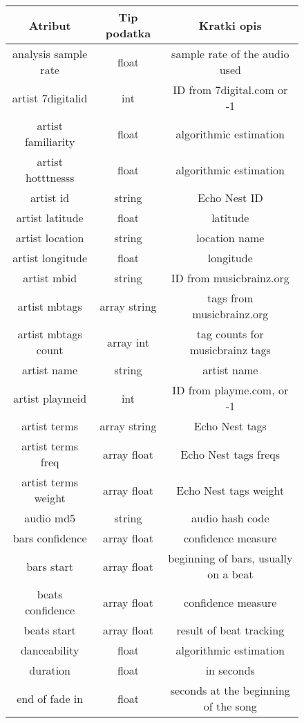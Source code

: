 \documentclass[a4paper]{article}
\begin{document}
\begin{figure}[!h]
    \centering
    \footnotesize
    \begin{tabular}{|c|c|c|}
        \hline
        Atribut & Tip podatka & Kratki opis \\
        \hline
        analysis sample rate & float & sample rate of the audio used \\
        artist 7digitalid & int & ID from 7digital.com or -1 \\
        artist familiarity & float & algorithmic estimation \\
        artist hotttnesss & float & algorithmic estimation \\
        artist id & string & Echo Nest ID \\
        artist latitude & float & latitude \\
        artist location & string & location name \\
        artist longitude & float & longitude \\
        artist mbid & string & ID from musicbrainz.org \\
        artist mbtags & array string & tags from musicbrainz.org \\
        artist mbtags count & array int & tag counts for musicbrainz tags \\
        artist name & string & artist name \\
        artist playmeid & int & ID from playme.com, or -1 \\
        artist terms & array string & Echo Nest tags \\
        artist terms freq & array float & Echo Nest tags freqs \\
        artist terms weight & array float & Echo Nest tags weight \\
        audio md5 & string & audio hash code \\
        bars confidence & array float & confidence measure \\
        bars start & array float & beginning of bars, usually on a beat \\
        beats confidence & array float & confidence measure \\
        beats start & array float & result of beat tracking \\
        danceability & float & algorithmic estimation \\
        duration & float & in seconds \\
        end of fade in & float & seconds at the beginning of the song \\

\end{tabular}
\end{figure}
\end{document}
